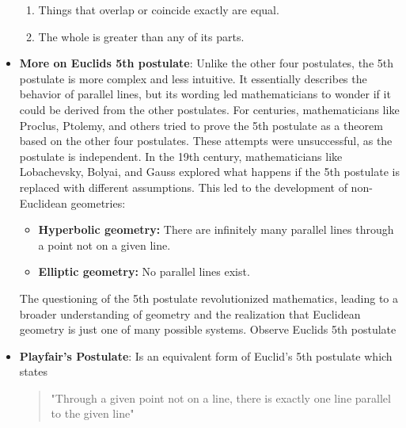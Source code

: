\documentclass{report}
\begin{document}
\begin{itemize}
\begin{enumerate}
                \item Things that overlap or coincide exactly are equal.
                \item The whole is greater than any of its parts.
            \end{enumerate}
        \item \textbf{More on Euclids 5th postulate}: Unlike the other four postulates, the 5th postulate is more complex and less intuitive. It essentially describes the behavior of parallel lines, but its wording led mathematicians to wonder if it could be derived from the other postulates.
            \bigbreak \noindent 
            For centuries, mathematicians like Proclus, Ptolemy, and others tried to prove the 5th postulate as a theorem based on the other four postulates. These attempts were unsuccessful, as the postulate is independent.
            \bigbreak \noindent 
            In the 19th century, mathematicians like Lobachevsky, Bolyai, and Gauss explored what happens if the 5th postulate is replaced with different assumptions. This led to the development of non-Euclidean geometries:
            \begin{itemize}
                \item \textbf{Hyperbolic geometry:} There are infinitely many parallel lines through a point not on a given line.
                \item \textbf{Elliptic geometry:} No parallel lines exist.
            \end{itemize}
            The questioning of the 5th postulate revolutionized mathematics, leading to a broader understanding of geometry and the realization that Euclidean geometry is just one of many possible systems.
            \bigbreak \noindent 
            Observe Euclids 5th postulate
            \bigbreak \noindent 
        \item \textbf{ Playfair's Postulate}: Is an equivalent form of Euclid's 5th postulate which states 
            \begin{quote}
                "Through a given point not on a line, there is exactly one line parallel to the given line"
            \end{quote}
    \end{itemize}

    \pagebreak 
\end{document}
